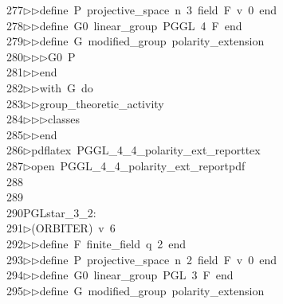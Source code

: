 \begin{tabbing}
277\>$\triangleright$\>$\triangleright$\>define\ P\ projective\_space\ n\ 3\ field\ F\ v\ 0\ end\ \\[0pt]
278\>$\triangleright$\>$\triangleright$\>define\ G0\ linear\_group\ PGGL\ 4\ F\ end\ \\[0pt]
279\>$\triangleright$\>$\triangleright$\>define\ G\ modified\_group\ polarity\_extension\ \\[0pt]
280\>$\triangleright$\>$\triangleright$\>$\triangleright$\>G0\ P\ \\[0pt]
281\>$\triangleright$\>$\triangleright$\>end\ \\[0pt]
282\>$\triangleright$\>$\triangleright$\>with\ G\ do\ \\[0pt]
283\>$\triangleright$\>$\triangleright$\>group\_theoretic\_activity\ \\[0pt]
284\>$\triangleright$\>$\triangleright$\>$\triangleright$\>classes\ \\[0pt]
285\>$\triangleright$\>$\triangleright$\>end\\[0pt]
286\>$\triangleright$\>pdflatex\ PGGL\_4\_4\_polarity\_ext\_reporttex\\[0pt]
287\>$\triangleright$\>open\ PGGL\_4\_4\_polarity\_ext\_reportpdf\\[0pt]
288\>\\[0pt]
289\>\\[0pt]
290\>PGLstar\_3\_2:\\[0pt]
291\>$\triangleright$\>(ORBITER)\ v\ 6\ \\[0pt]
292\>$\triangleright$\>$\triangleright$\>define\ F\ finite\_field\ q\ 2\ end\ \\[0pt]
293\>$\triangleright$\>$\triangleright$\>define\ P\ projective\_space\ n\ 2\ field\ F\ v\ 0\ end\ \\[0pt]
294\>$\triangleright$\>$\triangleright$\>define\ G0\ linear\_group\ PGL\ 3\ F\ end\ \\[0pt]
295\>$\triangleright$\>$\triangleright$\>define\ G\ modified\_group\ polarity\_extension\ \\[0pt]

\end{tabbing}
